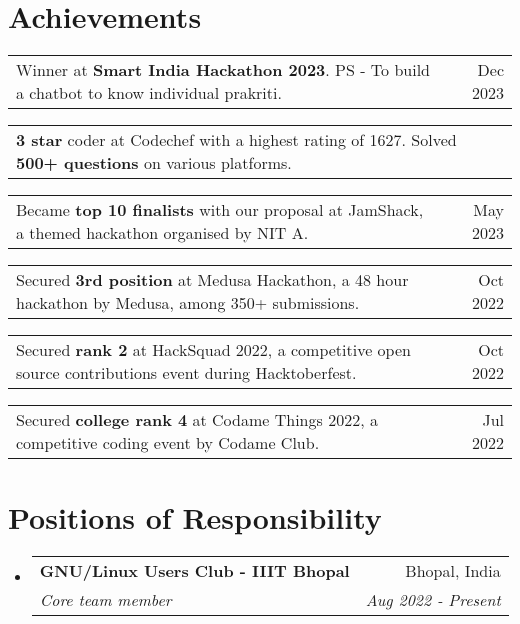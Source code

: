 \documentclass[a4paper,20pt]{article}
\makeatletter
\newcommand{\resumeSubheading}[4]{
  \vspace{-1pt}\item
    \begin{tabular*}{0.97\textwidth}{l@{\extracolsep{\fill}}r}
      \textbf{#1} & #2 \\
      \textit{#3} & \textit{#4} \\
    \end{tabular*}\vspace{-5pt}
}
\newcommand{\resumeSmallSubheading}[2]{
  \vspace{-1pt}\item
    \begin{tabular*}{0.97\textwidth}{l@{\extracolsep{\fill}}r}
      #1 & #2 \\
    \end{tabular*}\vspace{-8pt}
}
\newcommand{\resumeSubHeadingListStart}{\begin{itemize}[label={}, leftmargin=*]}
\newcommand{\resumeSubHeadingListEnd}{\end{itemize}}
\makeatother
\begin{document}
\vspace{-2pt}
\section{Achievements}
\begin{description}[font=$\bullet$]
  \resumeSmallSubheading{Winner at \textbf{Smart India Hackathon 2023}. PS - To build a chatbot to know individual prakriti.}{Dec 2023}
  \vspace{-10pt}
  \resumeSmallSubheading{\textbf{3 star} coder at Codechef with a highest rating of 1627. Solved \textbf{500+ questions} on various platforms.}{}
  \vspace{-10pt}
  \resumeSmallSubheading{Became \textbf{top 10 finalists} with our proposal at JamShack, a themed hackathon organised by NIT A.}{May 2023}
  \vspace{-10pt}
  \resumeSmallSubheading{Secured \textbf{3rd position} at Medusa Hackathon, a 48 hour hackathon by Medusa, among 350+ submissions.}{Oct 2022}
  \vspace{-10pt}
  \resumeSmallSubheading{Secured \textbf{rank 2} at HackSquad 2022, a competitive open source contributions event during Hacktoberfest.} {Oct 2022}
  \vspace{-10pt}
  \resumeSmallSubheading{Secured \textbf{college rank 4} at Codame Things 2022, a competitive coding event by Codame Club.}{Jul 2022}
  \vspace{-10pt}
\end{description}

\vspace{-2pt}
\section{Positions of Responsibility}
\resumeSubHeadingListStart
    \resumeSubheading
    {GNU/Linux Users Club - IIIT Bhopal}{Bhopal, India}
    {Core team member}{Aug 2022 - Present}

\resumeSubHeadingListEnd

\vspace{-5pt}
\end{document}
